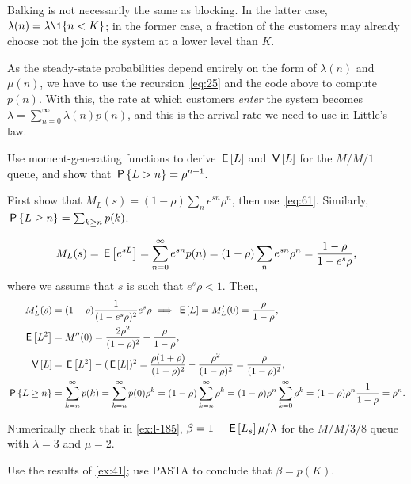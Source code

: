 Balking is not necessarily the same as blocking.
In the latter case, $\lambda(n)= \lambda \1{n < K}$; in the former case, a fraction of the customers may already choose not the join the system at a lower level than $K$.

As the steady-state probabilities depend entirely on the form of $\lambda(n)$ and $\mu(n)$, we have to use the recursion~\cref{eq:25} and the code above to compute $p(n)$.
With this, the  rate at which customers \emph{enter} the system becomes $\lambda = \sum_{n=0}^\infty \lambda(n) p(n)$, and this is the arrival rate we need to use in Little's law.


\begin{exercise}\label{ex:34}
Use moment-generating functions to derive $\E\L$ and $\V\L$ for the $M/M/1$ queue, and show that $\P{L>n} = \rho^{n+1}$.
\begin{hint}
First show that $M_L(s) = (1-\rho) \sum_n e^{s n} \rho^n$, then use~\cref{eq:61}.
Similarly, $\P{\L\geq n} = \sum_{k\geq n} p(k)$.
\end{hint}
\begin{solution}
\begin{equation*}
 M_L(s) = \E{e^{s L}} = \sum_{n=0}^\infty e^{s n}p(n) = (1-\rho) \sum_n e^{s n} \rho^n=\frac{1-\rho}{1-e^{s}\rho},
\end{equation*}
where we assume that $s$ is such that $e^s \rho < 1$. Then,
\begin{align*}
 M_L'(s) &= (1-\rho) \frac{1}{(1-e^s\rho)^2} e^s \rho \implies \E\L = M_L'(0)= \frac{\rho}{1-\rho}, \\
 \E{\L^2}&= M''(0)= \frac{2\rho^2}{(1-\rho)^2} + \frac{\rho}{1-\rho},\\
\V\L &= \E{L^2} - (\E\L)^2 = \frac{\rho(1+\rho)}{(1-\rho)^2}-\frac{\rho^2}{(1-\rho)^2} = \frac{\rho}{(1-\rho)^2},\\
 \P{\L\geq n}
 &= \sum_{k=n}^\infty p(k) = \sum_{k=n}^\infty p(0)\rho^k = (1-\rho)\sum_{k=n}^\infty \rho^k
= (1-\rho)\rho^n \sum_{k=0}^\infty\rho^k = (1-\rho) \rho^n \frac1{1-\rho} = \rho^n.
\end{align*}
\end{solution}
\end{exercise}

\begin{exercise}
Numerically check that in \cref{ex:l-185}, $\beta=1-\E\Ls \mu /\lambda$ for the $M/M/3/8$ queue with $\lambda=3$ and $\mu=2$.
\begin{solution}
Use the results of \cref{ex:41}; use PASTA to conclude that $\beta=p(K)$.
\end{solution}
\end{exercise}




